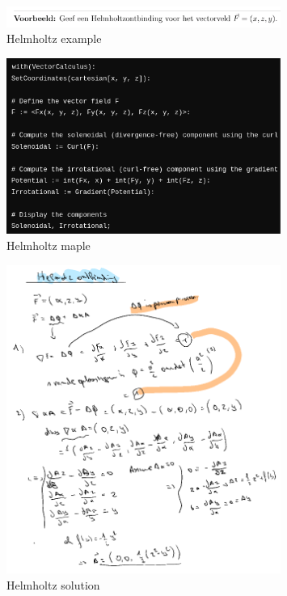 \documentclass[a4paper]{report}
\begin{document}
\begin{figure}[H]
	\centering
	\includegraphics[width=0.8\textwidth]{assets/helmholtz_example.png}
	\caption{Helmholtz example}
	\label{fig:helmholtz_example}
\end{figure}

\begin{figure}[H]
	\centering
	\includegraphics[width=0.8\textwidth]{assets/helmholtz_maple.png}
	\caption{Helmholtz maple}
	\label{fig:helmholtz_maple}
\end{figure}

\begin{figure}[H]
	\centering
	\includegraphics[width=0.8\textwidth]{assets/helmholtz_sol.png}
	\caption{Helmholtz solution}
	\label{fig:helmholtz_sol}
\end{figure}
\end{document}

